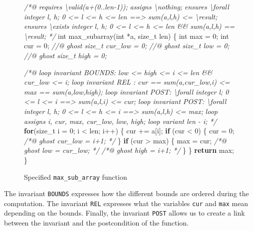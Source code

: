 \documentclass[12pt,francais,]{scrbook}
\newenvironment{Shaded}{}{}
\newcommand{\KeywordTok}[1]{\textcolor[rgb]{0.00,0.44,0.13}{\textbf{{#1}}}}
\newcommand{\DataTypeTok}[1]{\textcolor[rgb]{0.56,0.13,0.00}{{#1}}}
\newcommand{\DecValTok}[1]{\textcolor[rgb]{0.25,0.63,0.44}{{#1}}}
\newcommand{\CommentTok}[1]{\textcolor[rgb]{0.38,0.63,0.69}{\textit{{#1}}}}
\newcommand{\NormalTok}[1]{{#1}}
\begin{document}
\begin{figure}
\begin{footnotesize}\begin{Shaded}
\begin{Highlighting}[]
\CommentTok{/*@ }
\CommentTok{  requires \textbackslash{}valid(a+(0..len-1));}
\CommentTok{  assigns \textbackslash{}nothing;}
\CommentTok{  ensures \textbackslash{}forall integer l, h;  0 <= l <= h <= len ==> sum(a,l,h) <= \textbackslash{}result;}
\CommentTok{  ensures \textbackslash{}exists integer l, h;  0 <= l <= h <= len &&  sum(a,l,h) == \textbackslash{}result;}
\CommentTok{*/}
\DataTypeTok{int} \NormalTok{max_subarray(}\DataTypeTok{int} \NormalTok{*a, size_t len) \{}
  \DataTypeTok{int} \NormalTok{max = }\DecValTok{0}\NormalTok{;}
  \DataTypeTok{int} \NormalTok{cur = }\DecValTok{0}\NormalTok{;}
  \CommentTok{//@ ghost size_t cur_low = 0; }
  \CommentTok{//@ ghost size_t low = 0;}
  \CommentTok{//@ ghost size_t high = 0; }

  \CommentTok{/*@ }
\CommentTok{    loop invariant BOUNDS: low <= high <= i <= len && cur_low <= i;}
\CommentTok{    }
\CommentTok{    loop invariant REL :   cur == sum(a,cur_low,i) <= max == sum(a,low,high);}
\CommentTok{    loop invariant POST:   \textbackslash{}forall integer l;    0 <= l <= i      ==> sum(a,l,i) <= cur;}
\CommentTok{    loop invariant POST:   \textbackslash{}forall integer l, h; 0 <= l <= h <= i ==> sum(a,l,h) <= max;}
\CommentTok{   }
\CommentTok{    loop assigns i, cur, max, cur_low, low, high;}
\CommentTok{    loop variant len - i; }
\CommentTok{  */}
  \KeywordTok{for}\NormalTok{(size_t i = }\DecValTok{0}\NormalTok{; i < len; i++) \{}
    \NormalTok{cur += a[i];}
    \KeywordTok{if} \NormalTok{(cur < }\DecValTok{0}\NormalTok{) \{}
      \NormalTok{cur = }\DecValTok{0}\NormalTok{;}
      \CommentTok{/*@ ghost cur_low = i+1; */}
    \NormalTok{\}}
    \KeywordTok{if} \NormalTok{(cur > max) \{}
      \NormalTok{max = cur;}
      \CommentTok{/*@ ghost low = cur_low; */}
      \CommentTok{/*@ ghost high = i+1; */}
    \NormalTok{\}}
  \NormalTok{\}}
  \KeywordTok{return} \NormalTok{max;}
\NormalTok{\}}
\end{Highlighting}
\end{Shaded}\end{footnotesize}
\caption{Specified \texttt{max\_sub\_array} function}
\label{fig:6-2-2-maxsub}
\end{figure}

The invariant \texttt{BOUNDS} expresses how the different bounds are
ordered during the computation. The invariant \texttt{REL} expresses
what the variables \texttt{cur} and \texttt{max} mean depending on the
bounds. Finally, the invariant \texttt{POST} allows us to create a link
between the invariant and the postcondition of the function.
\end{document}
